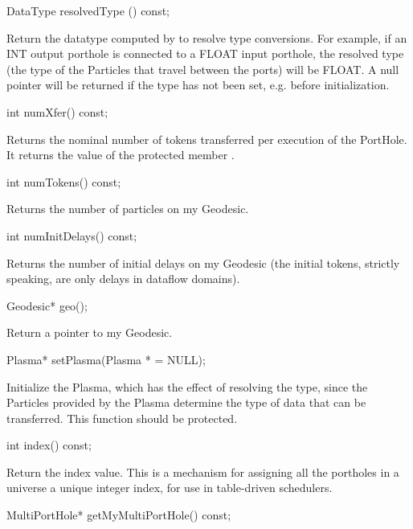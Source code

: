 \begin{example}
DataType resolvedType () const;
\end{example}

Return the datatype computed by  to resolve
type conversions.  For example, if an INT output porthole is connected
to a FLOAT input porthole, the resolved type (the type of the Particles
that travel between the ports) will be FLOAT.  A null pointer will be
returned if the type has not been set, e.g. before initialization.

\begin{example}
int numXfer() const;
\end{example}

Returns the nominal number of tokens transferred per execution of the
PortHole.  It returns the value of the protected member .

\begin{example}
int numTokens() const;
\end{example}

Returns the number of particles on my Geodesic.

\begin{example}
int numInitDelays() const;
\end{example}

Returns the number of initial delays on my Geodesic (the initial tokens,
strictly speaking, are only delays in dataflow domains).

\begin{example}
Geodesic* geo();
\end{example}

Return a pointer to my Geodesic.

\begin{example}
Plasma* setPlasma(Plasma * = NULL);
\end{example}

Initialize the Plasma, which has the effect of resolving the type, since
the Particles provided by the Plasma determine the type of data that can
be transferred.  This function should be protected.

\begin{example}
int index() const;
\end{example}

Return the index value.  This is a mechanism for assigning all the
portholes in a universe a unique integer index, for use in table-driven
schedulers.

\begin{example}
MultiPortHole* getMyMultiPortHole() const;
\end{example}


